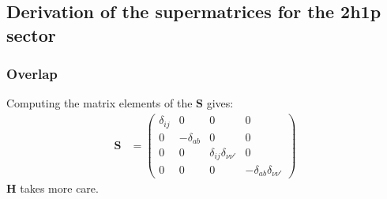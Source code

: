 \subsection{Derivation of the supermatrices for the 2h1p sector}
\subsubsection{Overlap}
Computing the matrix elements of the $\bm{S}$ gives:
\begin{align}
\bm{S} &= \begin{pmatrix}
    \delta_{ij} & 0 & 0 & 0 \\
    0 & -\delta_{ab} & 0 & 0 \\
    0 & 0 & \delta_{ij}\delta_{\nu\nu'} & 0 \\
    0 & 0 & 0 & -\delta_{ab}\delta_{\nu\nu'}
\end{pmatrix}
\end{align}
\newpage
$\bm{H}$ takes more care. 
